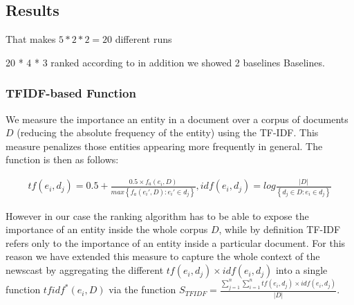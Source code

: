 \documentclass{llncs}
\begin{document}
\subsection{Results}
\label{sec:results}

That makes $5 * 2 * 2 = 20$ different runs 

20 * 4 * 3
ranked according to 
in addition we showed 2 baselines
Baselines.

\subsubsection{TFIDF-based Function}
We measure the importance an entity in a document over a corpus of documents $D$ (reducing the absolute frequency of the entity) using the TF-IDF. This measure penalizes those entities appearing more frequently in general. The function is then as follows:

\begin{equation}
\begin{matrix}
tf(e_i,d_j) = 0.5 + \frac{0.5\times f_{a}(e_i,D)}{max\left \{ f_{a}(e_i',D) : e_i' \in d_j\right \}},   idf(e_i,d_j) = log\frac{\left | D \right |}{\left \{ d_j\in D  :  e_i\in d_j \right \}}
\end{matrix}
\end{equation}

However in our case the ranking algorithm has to be able to expose the importance of an entity inside the whole corpus $D$, while by definition TF-IDF refers only to the importance of an entity inside a particular document. 
For this reason we have extended this measure to capture the whole context of the newscast by aggregating the different $tf(e_i,d_j) \times idf(e_i,d_j)$ into a single function $tfidf^{*}(e_i,D)$ via the function $S_{TFIDF}= \frac{ \sum_{j=1}^{n} \sum_{i=1}^{n} tf(e_i,d_j) \times idf(e_i,d_j)} {|D|}$.
\end{document}
